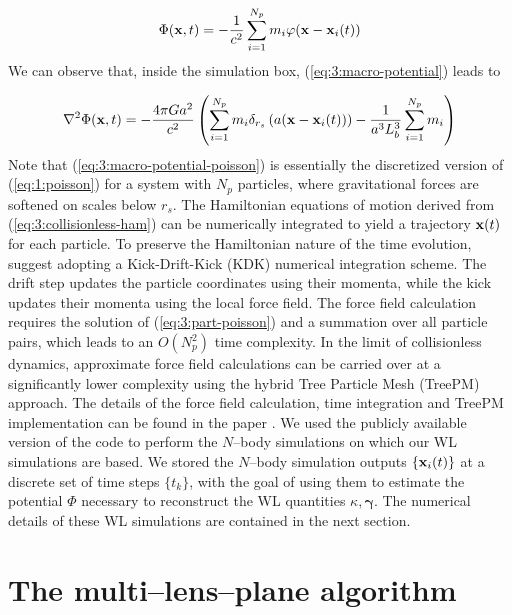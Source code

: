 \begin{equation}
\label{eq:3:macro-potential}
\Phi(\mathbf{x},t) = -\frac{1}{c^2}\sum_{i=1}^{N_p} m_i\varphi(\mathbf{x}-\mathbf{x}_i(t))
\end{equation} 
%
We can observe that, inside the simulation box, (\ref{eq:3:macro-potential}) leads to 

\begin{equation}
\label{eq:3:macro-potential-poisson}
\nabla^2\Phi(\mathbf{x},t) = -\frac{4\pi Ga^2}{c^2}\left(\sum_{i=1}^{N_p}m_i\delta_{r_s}\left(a(\mathbf{x}-\mathbf{x}_i(t))\right)-\frac{1}{a^3L_b^3}\sum_{i=1}^{N_p}m_i\right)
\end{equation}
%
Note that (\ref{eq:3:macro-potential-poisson}) is essentially the discretized version of (\ref{eq:1:poisson}) for a system with $N_p$ particles, where gravitational forces are softened on scales below $r_s$. The Hamiltonian equations of motion derived from (\ref{eq:3:collisionless-ham}) can be numerically integrated to yield a trajectory $\mathbf{x}(t)$ for each particle. To preserve the Hamiltonian nature of the time evolution, \citep{gadget2} suggest adopting a Kick-Drift-Kick (KDK) numerical integration scheme. The drift step updates the particle coordinates using their momenta, while the kick updates their momenta using the local force field. The force field calculation requires the solution of (\ref{eq:3:part-poisson}) and a summation over all particle pairs, which leads to an $O(N_p^2)$ time complexity. In the limit of collisionless dynamics, approximate force field calculations can be carried over at a significantly lower complexity using the hybrid Tree Particle Mesh (TreePM) approach. The details of the force field calculation, time integration and TreePM implementation can be found in the  paper \citep{gadget2}. We used the publicly available version of the  code to perform the $N$--body simulations on which our WL simulations are based. We stored the $N$--body simulation outputs $\{\mathbf{x}_i(t)\}$ at a discrete set of time steps $\{t_k\}$, with the goal of using them to estimate the potential $\Phi$ necessary to reconstruct the WL quantities $\kappa,\pmb{\gamma}$. The numerical details of these WL simulations are contained in the next section.  


\section{The multi--lens--plane algorithm}

